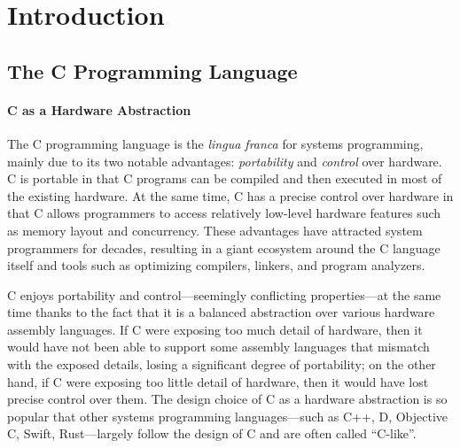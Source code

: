 \section{Introduction}
\label{sec:introduction}

\subsection{The C Programming Language}

\paragraph{C as a Hardware Abstraction}

The C programming language is the \emph{lingua franca} for systems programming, mainly due to its
two notable advantages: \emph{portability} and \emph{control} over hardware.  C is portable in that
C programs can be compiled and then executed in most of the existing hardware.  At the same time, C
has a precise control over hardware in that C allows programmers to access relatively low-level
hardware features such as memory layout and concurrency.  These advantages have attracted system
programmers for decades, resulting in a giant ecosystem around the C language itself and tools such
as optimizing compilers, linkers, and program analyzers.

C enjoys portability and control---seemingly conflicting properties---at the same time thanks to the
fact that it is a balanced abstraction over various hardware assembly languages.  If C were exposing
too much detail of hardware, then it would have not been able to support some assembly languages
that mismatch with the exposed details, losing a significant degree of portability; on the other
hand, if C were exposing too little detail of hardware, then it would have lost precise control over
them.  The design choice of C as a hardware abstraction is so popular that other systems programming
languages---such as C++, D, Objective C, Swift, Rust---largely follow the design of C and are often
called ``C-like''.




